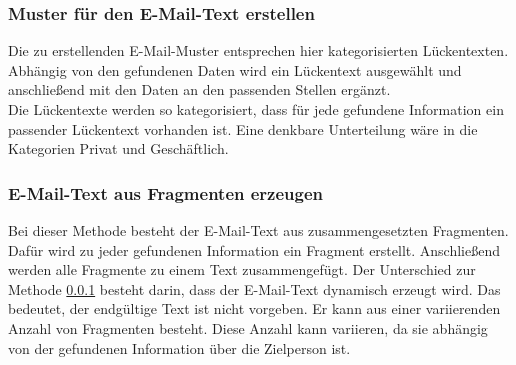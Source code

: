 		\subsubsection{Muster für den E-Mail-Text erstellen}
		\label{subsubsec:EMailMusterMethode}
		Die zu erstellenden E-Mail-Muster entsprechen hier kategorisierten Lückentexten. Abhängig von den gefundenen Daten wird ein Lückentext ausgewählt und anschließend mit den Daten an den passenden Stellen ergänzt.\\
		Die Lückentexte werden so kategorisiert, dass für jede gefundene Information ein passender Lückentext vorhanden ist. Eine denkbare Unterteilung wäre in die Kategorien Privat und Geschäftlich.
	
		\subsubsection{E-Mail-Text aus Fragmenten erzeugen}
		\label{subsubsec:EMailTextFragment}
		Bei dieser Methode besteht der E-Mail-Text aus zusammengesetzten Fragmenten. Dafür wird zu jeder gefundenen Information ein Fragment erstellt. Anschließend werden alle Fragmente zu einem Text zusammengefügt. Der Unterschied zur Methode \ref{subsubsec:EMailMusterMethode} besteht darin, dass der E-Mail-Text dynamisch erzeugt wird. Das bedeutet, der endgültige Text ist nicht vorgeben. Er kann aus einer variierenden Anzahl von Fragmenten besteht. Diese Anzahl kann variieren, da sie abhängig von der gefundenen Information über die Zielperson ist.
		
		
		
